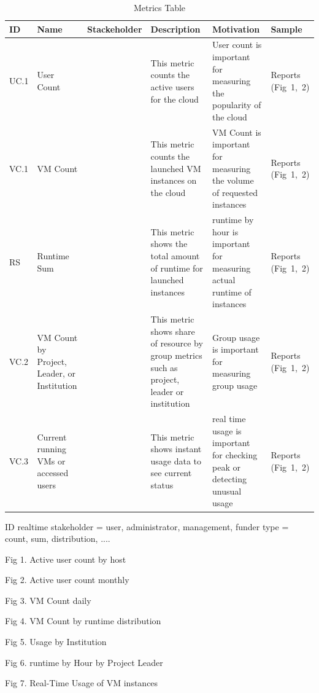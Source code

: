 \documentclass{sig-alternate-05-2015}
\begin{document}
\begin{table}[htb]

\caption{Metrics Table}
\begin{scriptsize}
\label{T:metrics}
\bigskip
\begin{center}
\begin{tabular}{lp{}p{}p{}p{}p{}}
ID & Name & Stackeholder & Description & Motivation & Sample \\
\hline
UC.1&
User Count & 
~&
This metric counts the active users for the cloud &
User count is important for measuring the popularity of the cloud & 
Reports (Fig~1,~2) \\
\hline
VC.1&
VM Count & 
~&
This metric counts the launched VM instances on the cloud &
VM Count is important for measuring the volume of requested instances &
Reports (Fig~1,~2) \\
\hline
RS&
Runtime Sum&
~&
This metric shows the total amount of runtime for launched instances &
runtime by hour is important for measuring actual runtime of instances &
Reports (Fig~1,~2) \\
\hline
VC.2&
VM Count by Project, Leader, or Institution &
~&
This metric shows share of resource by group metrics such as project, leader or institution &
Group usage is important for measuring group usage &
Reports (Fig~1,~2) \\
\hline
VC.3 &
Current running VMs or accessed users &
~&
This metric shows instant usage data to see current status &
real time usage is important for checking peak or detecting unusual usage &
Reports (Fig~1,~2) \\
\hline
\end{tabular}
\end{center}
\end{scriptsize}
\end{table}

ID
realtime
stakeholder = user, administrator, management, funder
type = count, sum, distribution, ....

Fig 1. Active user count by host                  

Fig 2. Active user count monthly

Fig 3. VM Count daily
 
Fig 4. VM Count by runtime distribution

Fig 5. Usage by Institution
 
Fig 6. runtime by Hour by Project Leader

Fig 7. Real-Time Usage of VM instances
 
\end{document}
